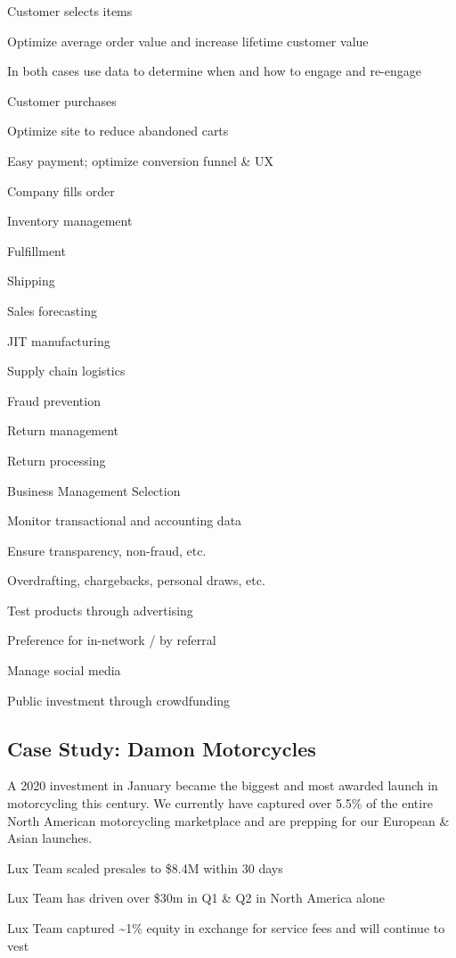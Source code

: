 \documentclass[11pt]{article}
\begin{document}
Customer selects items


Optimize average order value and increase lifetime customer value


In both cases use data to determine when and how to engage and re-engage


Customer purchases


Optimize site to reduce abandoned carts


Easy payment; optimize conversion funnel \& UX


Company fills order


Inventory management


Fulfillment


Shipping


Sales forecasting


JIT manufacturing


Supply chain logistics


Fraud prevention


Return management


Return processing


Business Management Selection


Monitor transactional and accounting data


Ensure transparency, non-fraud, etc.


Overdrafting, chargebacks, personal draws, etc.


Test products through advertising


Preference for in-network / by referral


Manage social media


Public investment through crowdfunding


\subsection{Case Study: Damon Motorcycles}

A 2020 investment in January became the biggest and most awarded launch in motorcycling this century. We currently have captured over 5.5\% of the entire North American motorcycling marketplace and are prepping for our European \& Asian launches.


Lux Team scaled presales to \$8.4M within 30 days


Lux Team has driven over \$30m in Q1 \& Q2 in North America alone


Lux Team captured \textasciitilde{}1\% equity in exchange for service fees and will continue to vest
\end{document}
